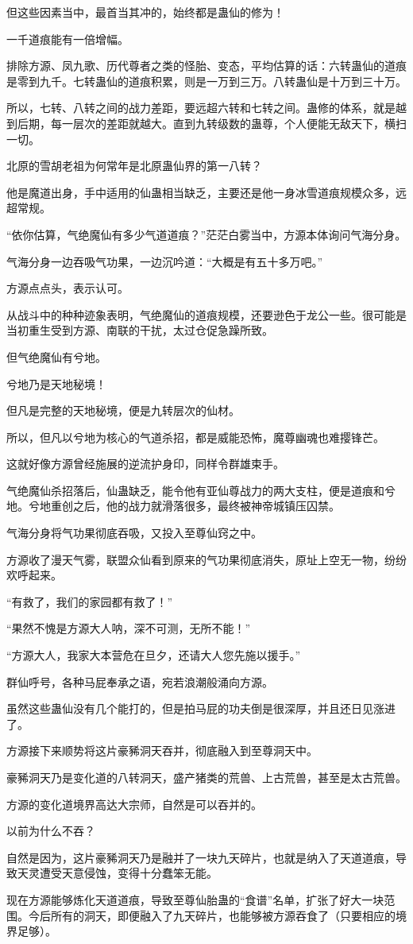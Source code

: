\begin{this_body}
但这些因素当中，最首当其冲的，始终都是蛊仙的修为！

一千道痕能有一倍增幅。

排除方源、凤九歌、历代尊者之类的怪胎、变态，平均估算的话：六转蛊仙的道痕是零到九千。七转蛊仙的道痕积累，则是一万到三万。八转蛊仙是十万到三十万。

所以，七转、八转之间的战力差距，要远超六转和七转之间。蛊修的体系，就是越到后期，每一层次的差距就越大。直到九转级数的蛊尊，个人便能无敌天下，横扫一切。

北原的雪胡老祖为何常年是北原蛊仙界的第一八转？

他是魔道出身，手中适用的仙蛊相当缺乏，主要还是他一身冰雪道痕规模众多，远超常规。

“依你估算，气绝魔仙有多少气道道痕？”茫茫白雾当中，方源本体询问气海分身。

气海分身一边吞吸气功果，一边沉吟道：“大概是有五十多万吧。”

方源点点头，表示认可。

从战斗中的种种迹象表明，气绝魔仙的道痕规模，还要逊色于龙公一些。很可能是当初重生受到方源、南联的干扰，太过仓促急躁所致。

但气绝魔仙有兮地。

兮地乃是天地秘境！

但凡是完整的天地秘境，便是九转层次的仙材。

所以，但凡以兮地为核心的气道杀招，都是威能恐怖，魔尊幽魂也难撄锋芒。

这就好像方源曾经施展的逆流护身印，同样令群雄束手。

气绝魔仙杀招落后，仙蛊缺乏，能令他有亚仙尊战力的两大支柱，便是道痕和兮地。兮地重创之后，他的战力就滑落很多，最终被神帝城镇压囚禁。

气海分身将气功果彻底吞吸，又投入至尊仙窍之中。

方源收了漫天气雾，联盟众仙看到原来的气功果彻底消失，原址上空无一物，纷纷欢呼起来。

“有救了，我们的家园都有救了！”

“果然不愧是方源大人呐，深不可测，无所不能！”

“方源大人，我家大本营危在旦夕，还请大人您先施以援手。”

群仙呼号，各种马屁奉承之语，宛若浪潮般涌向方源。

虽然这些蛊仙没有几个能打的，但是拍马屁的功夫倒是很深厚，并且还日见涨进了。

方源接下来顺势将这片豪豨洞天吞并，彻底融入到至尊洞天中。

豪豨洞天乃是变化道的八转洞天，盛产猪类的荒兽、上古荒兽，甚至是太古荒兽。

方源的变化道境界高达大宗师，自然是可以吞并的。

以前为什么不吞？

自然是因为，这片豪豨洞天乃是融并了一块九天碎片，也就是纳入了天道道痕，导致天灵遭受天意侵蚀，变得十分蠢笨无能。

现在方源能够炼化天道道痕，导致至尊仙胎蛊的“食谱”名单，扩张了好大一块范围。今后所有的洞天，即便融入了九天碎片，也能够被方源吞食了（只要相应的境界足够）。

\end{this_body}

